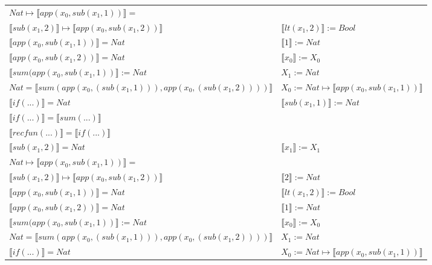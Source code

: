 \begin{exercise}
\begin{description}
\begin{center}
\begin{longtable}[!h]{ | l | l | }
                        $Nat \mapsto  \llbracket app(x_0, sub(x_1,1)) \rrbracket = $ & \\
			     $ \llbracket sub(x_1,2) \rrbracket \mapsto  \llbracket app(x_0, sub(x_1,2)) \rrbracket$ & $ \llbracket lt(x_1 , 2) \rrbracket := Bool$  \\
                        $ \llbracket app(x_0, sub(x_1,1)) \rrbracket = Nat$ &  $ \llbracket 1 \rrbracket := Nat$  \\
                        $ \llbracket app(x_0, sub(x_1,2)) \rrbracket = Nat$ & $ \llbracket x_0 \rrbracket := X_0$  \\
                        $ \llbracket sum(app(x_0, sub(x_1,1)) \rrbracket := Nat$ &  $X_1 := Nat$ \\
                        $Nat =  \llbracket sum(app(x_0, (sub(x_1,1))), app(x_0, (sub(x_1,2)))) \rrbracket$ & $X_0 := Nat \mapsto  \llbracket app(x_0, sub(x_1,1)) \rrbracket$ \\
                        $ \llbracket if(...) \rrbracket = Nat$ &   $ \llbracket sub(x_1,1) \rrbracket := Nat$ \\
                        $ \llbracket if(...) \rrbracket =  \llbracket sum(...) \rrbracket$ & \\
                        $ \llbracket recfun(...) \rrbracket =  \llbracket if(...) \rrbracket$ & \\
                    \hline
                        $ \llbracket sub(x_1,2) \rrbracket = Nat$ & $ \llbracket x_1 \rrbracket := X_1$  \\
                        $Nat \mapsto  \llbracket app(x_0, sub(x_1,1)) \rrbracket =$ & \\ 
			     $ \llbracket sub(x_1,2) \rrbracket \mapsto  \llbracket app(x_0, sub(x_1,2)) \rrbracket$ & $ \llbracket 2 \rrbracket := Nat$ \\
                        $ \llbracket app(x_0, sub(x_1,1)) \rrbracket = Nat$ & $ \llbracket lt(x_1 , 2) \rrbracket := Bool$\\
                        $ \llbracket app(x_0, sub(x_1,2)) \rrbracket = Nat$ &  $ \llbracket 1 \rrbracket := Nat$\\
                        $ \llbracket sum(app(x_0, sub(x_1,1)) \rrbracket := Nat$ & $ \llbracket x_0 \rrbracket := X_0$\\
                        $Nat =  \llbracket sum(app(x_0, (sub(x_1,1))), app(x_0, (sub(x_1,2)))) \rrbracket$ & $X_1 := Nat$\\
                        $ \llbracket if(...) \rrbracket = Nat$ & $X_0 := Nat \mapsto  \llbracket app(x_0, sub(x_1,1)) \rrbracket$\\

\end{longtable}
\end{center}
\end{description}
\end{exercise}
